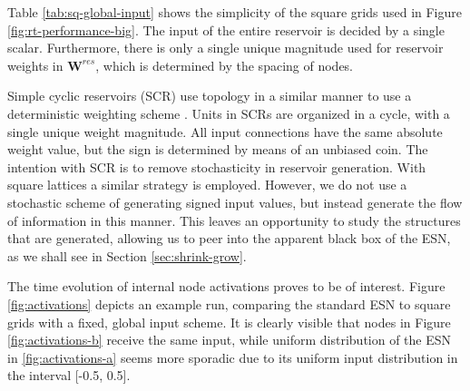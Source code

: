 Table \ref{tab:sq-global-input} shows the simplicity of the square grids used in
Figure \ref{fig:rt-performance-big}. The input of the entire reservoir is
decided by a single scalar. Furthermore, there is only a single unique magnitude
used for reservoir weights in $\mathbf{W}^{res}$, which is determined by the
spacing of nodes.

Simple cyclic reservoirs (SCR) use topology in a similar manner to use a
deterministic weighting scheme \cite{rodan_minimum_2011}. Units in SCRs are
organized in a cycle, with a single unique weight magnitude. All input
connections have the same absolute weight value, but the sign is determined by
means of an unbiased coin. The intention with SCR is to remove stochasticity in
reservoir generation. With square lattices a similar strategy is
employed. However, we do not use a stochastic scheme of generating signed input
values, but instead generate the flow of information in this manner. This leaves
an opportunity to study the structures that are generated, allowing us to peer
into the apparent black box of the ESN, as we shall see in Section
\ref{sec:shrink-grow}.

The time evolution of internal node activations proves to be of interest. Figure
\ref{fig:activations} depicts an example run, comparing the standard ESN to
square grids with a fixed, global input scheme. It is clearly visible that nodes
in Figure \ref{fig:activations-b} receive the same input, while uniform
distribution of the ESN in \ref{fig:activations-a} seems more sporadic due to
its uniform input distribution in the interval [-0.5, 0.5].

